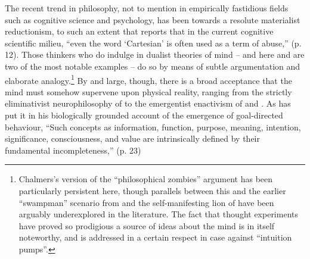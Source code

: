 The recent trend in philosophy, not to mention in empirically fastidious fields such as cognitive science and psychology, has been towards a resolute materialist reductionism, to such an extent that \cite{Rowlands} reports that in the current cognitive scientific milieu, ``even the word `Cartesian' is often used as a term of abuse,'' (p. 12).  Those thinkers who do indulge in dualist theories of mind -- and here \cite{Chalmers1996} and \cite{Fodor2008} are two of the most notable examples -- do so by means of subtle argumentation and elaborate analogy.\footnote{Chalmers's version of the ``philosophical zombies'' argument has been particularly persistent here, though parallels between this and the earlier ``swampman'' scenario from \cite{Davidson} and the self-manifesting lion of \cite{Millikan} have been arguably underexplored in the literature.  The fact that thought experiments have proved so prodigious a source of ideas about the mind is in itself noteworthy, and is addressed in a certain respect in  case against ``intuition pumps''.}  By and large, though, there is a broad acceptance that the mind must somehow supervene upon physical reality, ranging from the strictly eliminativist neurophilosophy of \cite{Churchland} to the emergentist enactivism of \cite{Thompson} and \cite{Hutto}.  As \cite{Deacon} has put it in his biologically grounded account of the emergence of goal-directed behaviour, ``Such concepts as information, function, purpose, meaning, intention, significance, consciousness, and value are intrinsically defined by their fundamental incompleteness,'' (p. 23)



